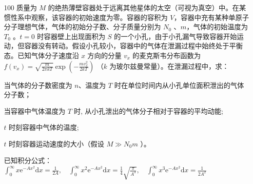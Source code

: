 \begin{problem}[第35届全国中学生物理竞赛决赛][绝热容器漏气过程]{100}
    质量为 $M$ 的绝热薄壁容器处于远离其他星体的太空（可视为真空）中。在某惯性系中观察，该容器的初始速度为零。容器的容积为 $V$，容器中充有某种单原子分子理想气体，气体的初始分子数、分子质量分别为 $N_{0}$ 、$m$，气体的初始温度为 $T_{0}$ 。$t=0$ 时容器壁上出现面积为 $S$ 的一个小孔，由于小孔漏气导致容器开始运动，但容器没有转动。假设小孔较小，容器中的气体在泄漏过程中始终处于平衡态。已知气体分子速度沿 $x$ 方向的分量 $v_{x}$ 的麦克斯韦分布函数为 $f(v_{x})=\sqrt{\frac{m}{2\pi kT}}\exp(-\frac{mv_{x}^{2}}{2kT})$ （$k$ 为玻尔兹曼常量）。在泄漏过程中，求：
    \begin{subproblem}
        当气体的分子数密度为 $n$、温度为 $T$ 时在单位时间内从小孔单位面积泄出的气体分子数；
    \end{subproblem}
    \begin{subproblem}
        当容器中气体温度为 $T$ 时, 从小孔泄出的气体分子相对于容器的平均动能;
    \end{subproblem}
    \begin{subproblem}
        $t$ 时刻容器中气体的温度;
    \end{subproblem}
    \begin{subproblem}
        $t$ 时刻容器运动速度的大小（假设 $M \gg N_{0}m$ ）。

        已知积分公式： $\int_0^\infty x\mathrm{e}^{-Ax^2}\mathrm{d}x = \frac{1}{2A},\quad \int_0^\infty x^2\mathrm{e}^{-Ax^2}\mathrm{d}x = \frac{1}{4}\sqrt{\frac{\pi}{A^3}},\quad \int_0^\infty x^3\mathrm{e}^{-Ax^2}\mathrm{d}x = \frac{1}{2A^2}$
    \end{subproblem}
\end{problem}